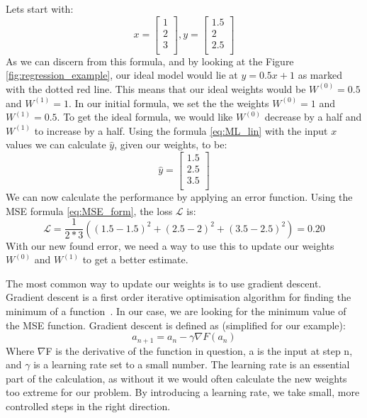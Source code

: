 \vspace{5px}
Lets start with: 
\begin{equation}
    x=\left[ \begin{array}{c} 1\\ 2\\ 3\\ \end{array} \right],
    y=\left[\begin{array}{c} 1.5\\2\\ 2.5\\\end{array}\right]
\end{equation}
As we can discern from this formula, and by looking at the Figure \ref{fig:regression_example}, our ideal model would lie at $y=0.5x + 1$ as marked with the dotted red line. This means that our ideal weights would be  $W^{(0)}=0.5$ and $W^{(1)}=1$.
In our initial formula, we set the the weights $W^{(0)}=1$ and $W^{(1)}=0.5$. To get the ideal formula, we would like $W^{(0)}$ decrease by a half and $W^{(1)}$ to increase by a half.
Using the formula \ref{eq:ML_lin} with the input $x$ values we can calculate $\hat{y}$, given our weights, to be:
\begin{equation}
    \hat{y}=\left[\begin{array}{c} 1.5\\ 2.5\\ 3.5\\ \end{array}\right]
\end{equation}
We can now calculate the performance by applying an error function. Using the MSE formula \ref{eq:MSE_form}, the loss $\mathcal{L}$ is:
\begin{equation}
   \mathcal{L} = \frac{1}{2*3} \left( {(1.5-1.5)}^2+{(2.5-2)}^2+{(3.5-2.5)}^2 \right) = 0.20
\end{equation}
With our new found error, we need a way to use this to update our weights $W^{(0)}$ and $W^{(1)}$ to get a better estimate. 
    

\noindent The most common way to update our weights is to use gradient descent. 
Gradient descent is a first order iterative optimisation algorithm for finding the minimum of a function~\cite{robbins1951}. In our case, we are looking for the minimum value of the MSE function. Gradient descent is defined as (simplified for our example):
\begin{equation}
    a_{n+1}= a_{n} - \gamma \nabla F(a_{n})
    \label{eq:gradientdecent}
\end{equation}
Where $\nabla$F is the derivative of the function in question, a is the input at step n, and $\gamma$ is a learning rate set to a small number. The learning rate is an essential part of the calculation, as without it we would often calculate the new weights too extreme for our problem. By introducing a learning rate, we take small, more controlled steps in the right direction. 

